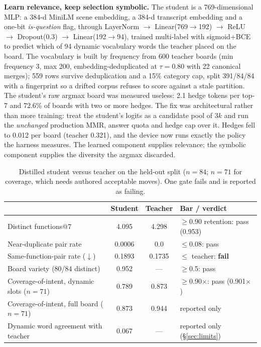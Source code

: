 \documentclass{article}
\begin{document}
\textbf{Learn relevance, keep selection symbolic.} The student is a
769-dimensional MLP: a 384-d MiniLM scene embedding, a 384-d transcript
embedding and a one-bit \emph{is-question} flag, through
LayerNorm $\rightarrow$ Linear(769$\rightarrow$192) $\rightarrow$ ReLU
$\rightarrow$ Dropout(0.3) $\rightarrow$ Linear(192$\rightarrow$94), trained
multi-label with sigmoid+BCE to predict which of 94 dynamic vocabulary words the
teacher placed on the board. The vocabulary is built by frequency from 600
teacher boards (min frequency 3, max 200, embedding-deduplicated at $\tau=0.80$
with 22 canonical merges); 559 rows survive deduplication and a 15\% category
cap, split 391/84/84 with a fingerprint so a drifted corpus refuses to score
against a stale partition. The student's raw argmax board was measured useless:
2.1 hedge tokens per top-7 and 72.6\% of boards with two or more hedges. The fix
was architectural rather than more training: treat the student's logits as a
candidate pool of $3k$ and run the \emph{unchanged} production MMR, answer quota
and hedge cap over it. Hedges fell to 0.012 per board (teacher 0.321), and the
device now runs exactly the policy the harness measures. The learned component
supplies relevance; the symbolic component supplies the diversity the argmax
discarded.

\begin{table}[t]
\centering
\small
\caption{Distilled student versus teacher on the held-out split ($n{=}84$;
$n{=}71$ for coverage, which needs authored acceptable moves). One gate fails
and is reported as failing.}
\label{tab:student}
\begin{tabular}{lccl}
\toprule
 & \textbf{Student} & \textbf{Teacher} & \textbf{Bar / verdict} \\
\midrule
Distinct functions@7                  & 4.095  & 4.298  & $\ge$0.90 retention: pass (0.953) \\
Near-duplicate pair rate              & 0.0006 & 0.0    & $\le$0.08: pass \\
Same-function-pair rate ($\downarrow$) & 0.1893 & 0.1735 & $\le$ teacher: \textbf{fail} \\
Board variety (80/84 distinct)        & 0.952  & ---    & $\ge$0.5: pass \\
Coverage-of-intent, dynamic slots ($n{=}71$) & 0.789 & 0.873 & $\ge$0.90$\times$: pass (0.901$\times$) \\
Coverage-of-intent, full board ($n{=}71$)     & 0.873 & 0.944 & reported only \\
Dynamic word agreement with teacher   & 0.067  & ---    & reported only (\S\ref{sec:limits}) \\
\bottomrule
\end{tabular}
\end{table}
\end{document}
